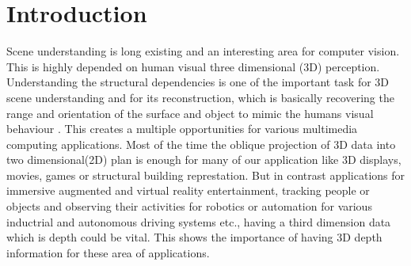 
\chapter{Introduction} %

\label{Chapter1} %


\newcommand{\keyword}[1]{\textbf{#1}}
\newcommand{\tabhead}[1]{\textbf{#1}}
\newcommand{\code}[1]{\texttt{#1}}
\newcommand{\file}[1]{\texttt{\bfseries#1}}
\newcommand{\option}[1]{\texttt{\itshape#1}}




Scene understanding is long existing and an interesting area for computer vision. This is highly depended on human visual three dimensional (3D) perception. Understanding the structural dependencies is one of the important task for 3D scene understanding and for its reconstruction, which is basically recovering the range and orientation of the surface and object to mimic the humans visual behaviour \cite{barnard1982computational}. This creates a multiple opportunities for various multimedia computing applications. Most of the time the oblique projection of 3D data into two dimensional(2D) plan is enough for many of our application like 3D displays, movies, games or structural building represtation. But in contrast applications for immersive augmented and virtual reality entertainment, tracking people or objects and observing their activities for robotics or automation for various inductrial and autonomous driving systems etc., having a third dimension data which is depth could be vital. This shows the importance of having 3D depth information for these area of applications. \\

